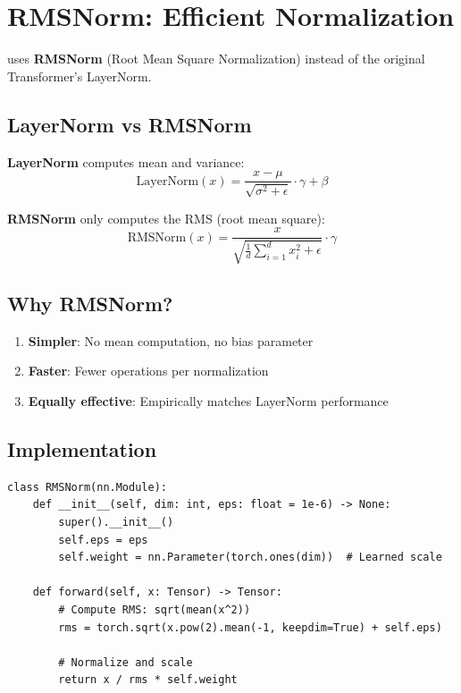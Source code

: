 \section{RMSNorm: Efficient Normalization}

\TryLM uses \textbf{RMSNorm} (Root Mean Square Normalization) instead of the original Transformer's LayerNorm.

\subsection{LayerNorm vs RMSNorm}

\textbf{LayerNorm} computes mean and variance:
\begin{equation}
\text{LayerNorm}(x) = \frac{x - \mu}{\sqrt{\sigma^2 + \epsilon}} \cdot \gamma + \beta
\end{equation}

\textbf{RMSNorm} only computes the RMS (root mean square):
\begin{equation}
\text{RMSNorm}(x) = \frac{x}{\sqrt{\frac{1}{d}\sum_{i=1}^{d} x_i^2 + \epsilon}} \cdot \gamma
\end{equation}

\subsection{Why RMSNorm?}

\begin{enumerate}
    \item \textbf{Simpler}: No mean computation, no bias parameter
    \item \textbf{Faster}: Fewer operations per normalization
    \item \textbf{Equally effective}: Empirically matches LayerNorm performance
\end{enumerate}

\subsection{Implementation}

\begin{lstlisting}[style=python, caption={RMSNorm from model.py}]
class RMSNorm(nn.Module):
    def __init__(self, dim: int, eps: float = 1e-6) -> None:
        super().__init__()
        self.eps = eps
        self.weight = nn.Parameter(torch.ones(dim))  # Learned scale

    def forward(self, x: Tensor) -> Tensor:
        # Compute RMS: sqrt(mean(x^2))
        rms = torch.sqrt(x.pow(2).mean(-1, keepdim=True) + self.eps)

        # Normalize and scale
        return x / rms * self.weight
\end{lstlisting}

